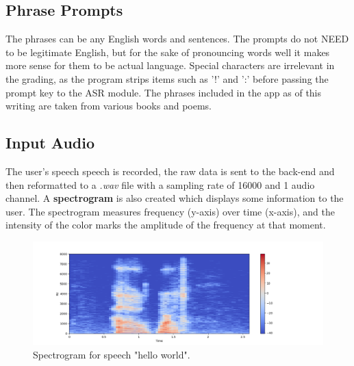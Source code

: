 \documentclass[12pt, letterpaper]{article}
\begin{document}
\subsection*{Phrase Prompts}
The phrases can be any English words and sentences. The prompts do not NEED to be legitimate English, but for the sake of pronouncing words well it makes more sense for them to be actual language. Special characters are irrelevant in the grading, as the program strips items such as '!' and ':' before passing the prompt key to the ASR module. The phrases included in the app as of this writing are taken from various books and poems. 

\subsection*{Input Audio}
The user's speech speech is recorded, the raw data is sent to the back-end and then reformatted to a \textit{.wav} file with a sampling rate of 16000 and 1 audio channel. A \textbf{spectrogram} is also created which displays some information to the user. The spectrogram measures frequency (y-axis) over time (x-axis), and the intensity of the color marks the amplitude of the frequency at that moment.

\begin{figure}[h!]
    \centering
    \includegraphics[width=1.1\textwidth]{images/spectro.pdf}
    \caption{Spectrogram for speech "hello world".}
\end{figure}


\newpage%
\end{document}
